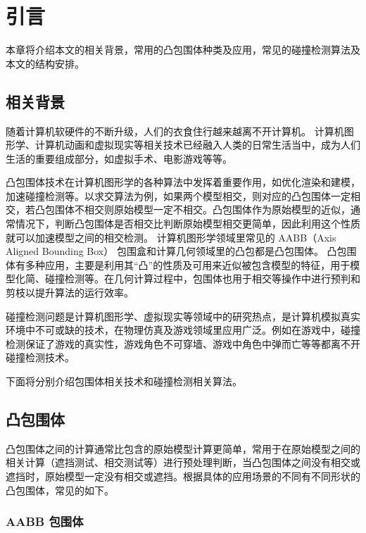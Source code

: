 

\chapter{引言}
\label{cha:intro}

本章将介绍本文的相关背景，常用的凸包围体种类及应用，常见的碰撞检测算法及本文的结构安排。

\section{相关背景}

随着计算机软硬件的不断升级，人们的衣食住行越来越离不开计算机。
计算机图形学、计算机动画和虚拟现实等相关技术已经融入人类的日常生活当中，成为人们生活的重要组成部分，如虚拟手术、电影游戏等等。

凸包围体技术在计算机图形学的各种算法中发挥着重要作用，如优化渲染和建模，加速碰撞检测等。以求交算法为例，如果两个模型相交，则对应的凸包围体一定相交，若凸包围体不相交则原始模型一定不相交。凸包围体作为原始模型的近似，通常情况下，判断凸包围体是否相交比判断原始模型相交更简单，因此利用这个性质就可以加速模型之间的相交检测。
计算机图形学领域里常见的 AABB（Axis Aligned Bounding Box） 包围盒和计算几何领域里的凸包都是凸包围体。
凸包围体有多种应用，主要是利用其“凸”的性质及可用来近似被包含模型的特征，用于模型化简、碰撞检测等。在几何计算过程中，包围体也用于相交等操作中进行预判和剪枝以提升算法的运行效率。

碰撞检测问题是计算机图形学、虚拟现实等领域中的研究热点，是计算机模拟真实环境中不可或缺的技术，在物理仿真及游戏领域里应用广泛。例如在游戏中，碰撞检测保证了游戏的真实性，游戏角色不可穿墙、游戏中角色中弹而亡等等都离不开碰撞检测技术。

下面将分别介绍包围体相关技术和碰撞检测相关算法。

\section{凸包围体}
\label{sec:convexbv}

凸包围体之间的计算通常比包含的原始模型计算更简单，常用于在原始模型之间的相关计算（遮挡测试、相交测试等）进行预处理判断，当凸包围体之间没有相交或遮挡时，原始模型一定没有相交或遮挡。根据具体的应用场景的不同有不同形状的凸包围体，常见的如下。

\subsection{AABB 包围体}

